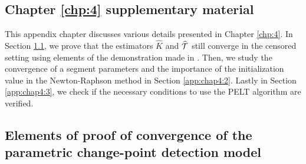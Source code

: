 \begin{appendices}
\chapter{Chapter \ref{chp:4} supplementary material} \label{app:chap4}


This appendix chapter discusses various details presented in Chapter \ref{chp:4}. In Section \ref{app:chap4:1}, we prove that the estimators $\widehat{K}$ and $\widehat{{\mathcal T}}$ still converge in the censored setting using elements of the demonstration made in \cite{Lavielle1997}. Then, we study the convergence of a segment parameters and the importance of the initialization value in the Newton-Raphson method in Section \ref{app:chap4:2}. Lastly in Section \ref{app:chap4:3}, we check if the necessary conditions to use the PELT algorithm are verified. 


\section{Elements of proof of convergence of the parametric change-point detection model}\label{app:chap4:1}



\end{appendices}
